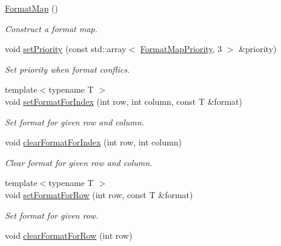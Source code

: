 \begin{DoxyCompactItemize}
\item 
\hyperlink{class_mdt_1_1_item_model_1_1_format_map_a63d0551849d06f3b5dec777e09022ff1}{Format\+Map} ()\hypertarget{class_mdt_1_1_item_model_1_1_format_map_a63d0551849d06f3b5dec777e09022ff1}{}\label{class_mdt_1_1_item_model_1_1_format_map_a63d0551849d06f3b5dec777e09022ff1}

\begin{DoxyCompactList}\small\item\em Construct a format map. \end{DoxyCompactList}\item 
void \hyperlink{class_mdt_1_1_item_model_1_1_format_map_a85f43d8c348e1792f32316850cc90364}{set\+Priority} (const std\+::array$<$ \hyperlink{namespace_mdt_1_1_item_model_a4f59200e524d67369e535854e7d8f12b}{Format\+Map\+Priority}, 3 $>$ \&priority)
\begin{DoxyCompactList}\small\item\em Set priority when format conflics. \end{DoxyCompactList}\item 
{\footnotesize template$<$typename T $>$ }\\void \hyperlink{class_mdt_1_1_item_model_1_1_format_map_a6eab528c819ecde8cda4393d0da28aea}{set\+Format\+For\+Index} (int row, int column, const T \&format)
\begin{DoxyCompactList}\small\item\em Set format for given row and column. \end{DoxyCompactList}\item 
void \hyperlink{class_mdt_1_1_item_model_1_1_format_map_a50b9217d6f0a388c0451c9ddfd2374e4}{clear\+Format\+For\+Index} (int row, int column)
\begin{DoxyCompactList}\small\item\em Clear format for given row and column. \end{DoxyCompactList}\item 
{\footnotesize template$<$typename T $>$ }\\void \hyperlink{class_mdt_1_1_item_model_1_1_format_map_a586db9a9a1ffead14e284691c3da6f6b}{set\+Format\+For\+Row} (int row, const T \&format)
\begin{DoxyCompactList}\small\item\em Set format for given row. \end{DoxyCompactList}\item 
void \hyperlink{class_mdt_1_1_item_model_1_1_format_map_acfbb7468ff0952c542b70cb064f1801b}{clear\+Format\+For\+Row} (int row)

\end{DoxyCompactItemize}
